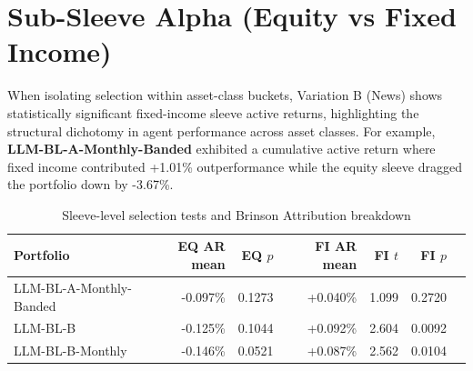 \documentclass[12pt]{report}
\begin{document}
\section{Sub-Sleeve Alpha (Equity vs Fixed Income)}
When isolating selection within asset-class buckets, Variation B (News) shows statistically significant fixed-income sleeve active returns, highlighting the structural dichotomy in agent performance across asset classes.
For example, \textbf{LLM-BL-A-Monthly-Banded} exhibited a cumulative active return where fixed income contributed +1.01\% outperformance while the equity sleeve dragged the portfolio down by -3.67\%.

\begin{table}[H]
    \centering
    \caption{Sleeve-level selection tests and Brinson Attribution breakdown}
    \label{tab:sleeve}
    \small
    \begin{tabular}{lrrrrrr}
        \toprule
        Portfolio               & EQ AR mean & EQ $p$ & FI AR mean & FI $t$ & FI $p$ \\
        \midrule
        LLM-BL-A-Monthly-Banded & -0.097\%   & 0.1273 & +0.040\%   & 1.099  & 0.2720 \\
        LLM-BL-B                & -0.125\%   & 0.1044 & +0.092\%   & 2.604  & 0.0092 \\
        LLM-BL-B-Monthly        & -0.146\%   & 0.0521 & +0.087\%   & 2.562  & 0.0104 \\
        \bottomrule
    \end{tabular}
\end{table}
\end{document}
